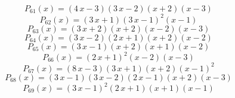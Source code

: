 \subitem \begin{dmath*}P_{61}(x) = {\left(4 \, x - 3\right)} {\left(3 \, x - 2\right)} {\left(x + 2\right)} {\left(x - 3\right)} \end{dmath*}\vspace{- 1.20000000000000 cm}
\subitem \begin{dmath*}P_{62}(x) = {\left(3 \, x + 1\right)} {\left(3 \, x - 1\right)}^{2} {\left(x - 1\right)} \end{dmath*}\vspace{- 1.20000000000000 cm}
\subitem \begin{dmath*}P_{63}(x) = {\left(3 \, x + 2\right)} {\left(x + 2\right)} {\left(x - 2\right)} {\left(x - 3\right)} \end{dmath*}\vspace{- 1.20000000000000 cm}
\subitem \begin{dmath*}P_{64}(x) = {\left(3 \, x - 2\right)} {\left(2 \, x + 1\right)} {\left(x + 2\right)} {\left(x - 2\right)} \end{dmath*}\vspace{- 1.20000000000000 cm}
\subitem \begin{dmath*}P_{65}(x) = {\left(3 \, x - 1\right)} {\left(x + 2\right)} {\left(x + 1\right)} {\left(x - 2\right)} \end{dmath*}\vspace{- 1.20000000000000 cm}
\subitem \begin{dmath*}P_{66}(x) = {\left(2 \, x + 1\right)}^{2} {\left(x - 2\right)} {\left(x - 3\right)} \end{dmath*}\vspace{- 1.20000000000000 cm}
\subitem \begin{dmath*}P_{67}(x) = {\left(8 \, x - 3\right)} {\left(3 \, x + 1\right)} {\left(x + 2\right)} {\left(x - 1\right)}^{2} \end{dmath*}\vspace{- 1.20000000000000 cm}
\subitem \begin{dmath*}P_{68}(x) = {\left(3 \, x - 1\right)} {\left(3 \, x - 2\right)} {\left(2 \, x - 1\right)} {\left(x + 2\right)} {\left(x - 3\right)} \end{dmath*}\vspace{- 1.20000000000000 cm}
\subitem \begin{dmath*}P_{69}(x) = {\left(3 \, x - 1\right)}^{2} {\left(2 \, x + 1\right)} {\left(x + 1\right)} {\left(x - 1\right)} \end{dmath*}\vspace{- 1.20000000000000 cm}
